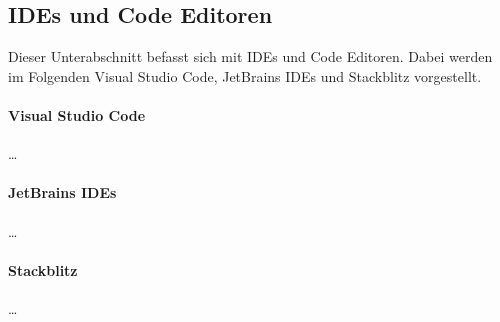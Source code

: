 \subsection{IDEs und Code Editoren}\label{section:stand-der-technik:weitere-entwicklungen:ides-und-code-editoren}

Dieser Unterabschnitt befasst sich mit IDEs und Code Editoren. Dabei werden im Folgenden Visual Studio Code, JetBrains IDEs und Stackblitz vorgestellt.

\paragraph{Visual Studio Code} \dots

\paragraph{JetBrains IDEs} \dots

\paragraph{Stackblitz} \dots

